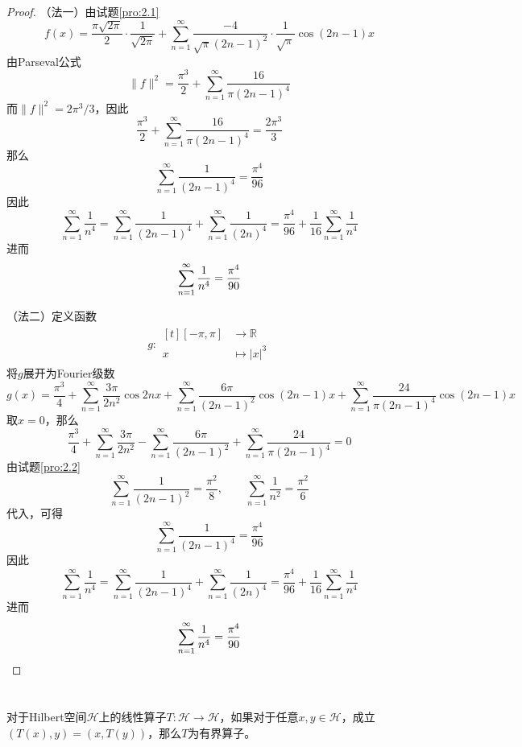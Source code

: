 \documentclass[lang = cn, scheme = chinese]{elegantbook}
\newcommand{\R}{\mathbb{R}}            %
\begin{document}
\begin{proof}
	（法一）由试题\ref{pro:2.1}
	$$
	f(x)=\frac{\pi\sqrt{2\pi}}{2}\cdot\frac{1}{\sqrt{2\pi}}+\sum_{n=1}^{\infty}\frac{-4}{\sqrt{\pi}(2n-1)^2}\cdot\frac{1}{\sqrt{\pi}}\cos (2n-1)x
	$$
	由Parseval公式
	$$
	\|f\|^2=\frac{\pi^3}{2}+\sum_{n=1}^{\infty}\frac{16}{\pi(2n-1)^4}
	$$
	而$\|f\|^2=2\pi^3/3$​，因此
	$$
	\frac{\pi^3}{2}+\sum_{n=1}^{\infty}\frac{16}{\pi(2n-1)^4}=\frac{2\pi^3}{3}
	$$
	那么
	$$
	\sum_{n=1}^{\infty}\frac{1}{(2n-1)^4}=\frac{\pi^4}{96}
	$$
	因此
	$$
	\sum_{n=1}^{\infty}\frac{1}{n^4}
	=\sum_{n=1}^{\infty}\frac{1}{(2n-1)^4}+\sum_{n=1}^{\infty}\frac{1}{(2n)^4}
	=\frac{\pi^4}{96}+\frac{1}{16}\sum_{n=1}^{\infty}\frac{1}{n^4}
	$$
	进而
	$$
	\sum_{n=1}^{\infty}\frac{1}{n^4}=\frac{\pi^4}{90}\\
	$$
	
	（法二）定义函数
	\begin{align*}
		g:\begin{aligned}[t]
			[-\pi,\pi]&\longrightarrow \R\\
			x&\longmapsto |x|^3
		\end{aligned}
	\end{align*}
	将$g$展开为Fourier级数
	$$
	g(x)=\frac{\pi^3}{4}
	+\sum_{n=1}^{\infty}\frac{3\pi}{2n^2}\cos{2nx}
	+\sum_{n=1}^{\infty}\frac{6\pi}{(2n-1)^2}\cos{(2n-1)x}
	+\sum_{n=1}^{\infty}\frac{24}{\pi(2n-1)^4}\cos(2n-1)x
	$$
	取$x=0$​，那么
	$$
	\frac{\pi^3}{4}
	+\sum_{n=1}^{\infty}\frac{3\pi}{2n^2}
	-\sum_{n=1}^{\infty}\frac{6\pi}{(2n-1)^2}
	+\sum_{n=1}^{\infty}\frac{24}{\pi(2n-1)^4}=0
	$$
	由试题\ref{pro:2.2}
	$$
	\sum_{n=1}^{\infty}\frac{1}{(2n-1)^2}=\frac{\pi^2}{8},\qquad \sum_{n=1}^{\infty}\frac{1}{n^2}=\frac{\pi^2}{6}
	$$
	代入，可得
	$$
	\sum_{n=1}^{\infty}\frac{1}{(2n-1)^4}=\frac{\pi^4}{96}
	$$
	因此
	$$
	\sum_{n=1}^{\infty}\frac{1}{n^4}
	=\sum_{n=1}^{\infty}\frac{1}{(2n-1)^4}+\sum_{n=1}^{\infty}\frac{1}{(2n)^4}
	=\frac{\pi^4}{96}+\frac{1}{16}\sum_{n=1}^{\infty}\frac{1}{n^4}
	$$
	进而
	$$
	\sum_{n=1}^{\infty}\frac{1}{n^4}=\frac{\pi^4}{90}\\
	$$
\end{proof}

\chapter{}

\begin{proposition}
	对于Hilbert空间$\mathcal{H}$上的线性算子$T:\mathcal{H}\to\mathcal{H}$，如果对于任意$x,y\in\mathcal{H}$，成立$(T(x),y)=(x,T(y))$，那么$T$为有界算子。
\end{proposition}
\end{document}
